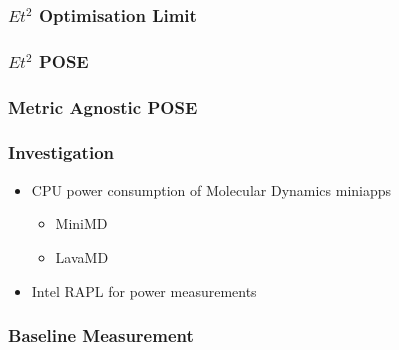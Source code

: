 \documentclass{beamer}
\begin{document}
  \begin{frame}
    \frametitle{$Et^2$ Optimisation Limit}
    \newcommand*{\OPTBOUND}{}%
    \newcommand*{\CONTBOUND}{}%
    \newcommand*{\OPTLIMIT}{}%
    \begin{figure}
    \centering
    
    \end{figure}
  \end{frame}

  \begin{frame}
    \frametitle{$Et^2$ POSE}
    \newcommand*{\OPTBOUND}{}%
    \newcommand*{\CONTBOUND}{}%
    \newcommand*{\OPTLIMIT}{}%
    \newcommand*{\POSELABELS}{}%
    \begin{figure}
    \centering
    
    \end{figure}
  \end{frame}




  \begin{frame}
    \frametitle{Metric Agnostic POSE}
    \begin{figure}
    \centering
    
    \end{figure}
  \end{frame}






  \begin{frame}
    \frametitle{Investigation}
    \begin{itemize}
      \item CPU power consumption of Molecular Dynamics miniapps
      \begin{itemize}
        \item MiniMD
        \item LavaMD
      \end{itemize}
      \item Intel RAPL for power measurements
    \end{itemize}
  \end{frame}

\begin{frame}[fragile]
\frametitle{Baseline Measurement}
\centering                                                                      
\lstset{basicstyle=\ttfamily\footnotesize\bfseries, frame=tb} %
              
\end{frame}
\end{document}
